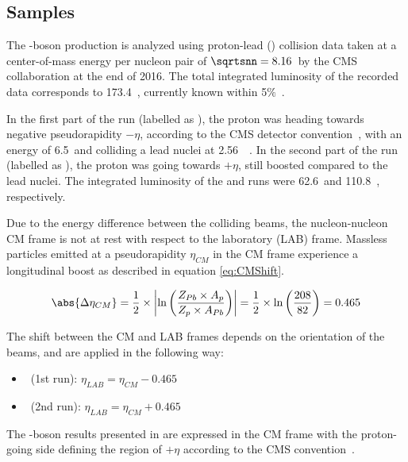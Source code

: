 \subsection{Samples} \label{sec:WBoson_Analysis_Samples}

The \W-boson production is analyzed using proton-lead (\pPb) collision data taken at a center-of-mass energy per nucleon pair of $\sqrtsnn = 8.16$~\TeV by the CMS collaboration at the end of 2016. The total integrated luminosity of the recorded data corresponds to 173.4~\nbinv, currently known within 5$\%$~\cite{LUMI}.

In the first part of the \pPb run (labelled as \RunPbp), the proton was heading towards negative pseudorapidity $-\eta$, according to the CMS detector convention~\cite{CMS}, with an energy of 6.5~\TeV and colliding a lead nuclei at 2.56~\TeV~\cite{LHC}. In the second part of the \pPb run (labelled as \RunpPb), the proton was going towards $+\eta$, still boosted compared to the lead nuclei. The integrated luminosity of the \RunPbp and \RunpPb runs were 62.6~\nbinv and 110.8~\nbinv, respectively.

Due to the energy difference between the \pPb colliding beams, the nucleon-nucleon CM frame is not at rest with respect to the laboratory (LAB) frame. Massless particles emitted at a pseudorapidity $\eta_{CM}$ in the CM frame experience a longitudinal boost as described in equation \ref{eq:CMShift}.

\begin{equation}
\abs{\Delta{\eta}_{CM}} = \frac{1}{2}\times\left|\ln\left(\frac{Z_{Pb}\times A_{p}}{Z_{p}\times A_{Pb}}\right)\right| = \frac{1}{2}\times\ln\left(\frac{208}{82}\right) = 0.465
\label{eq:CMShift}
\end{equation}

The shift between the CM and LAB frames depends on the orientation of the beams, and are applied in the following way:

\begin{itemize}
\item \RunPbp\ (1st run): $\eta_{LAB} = \eta_{CM} - 0.465$
\item \RunpPb\ (2nd run): $\eta_{LAB} = \eta_{CM} + 0.465$
\end{itemize}

The \W-boson results presented in  are expressed in the CM frame with the proton-going side defining the region of $+\eta$ according to the CMS convention~\cite{CMS}.

